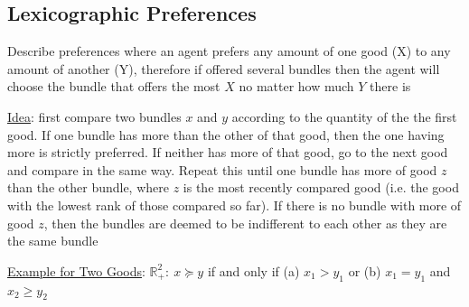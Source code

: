 \documentclass{article}
\begin{document}
\subsection{Lexicographic Preferences}
Describe preferences where an agent prefers any amount of one good (X) to any amount of another (Y), therefore if offered several bundles then the agent will choose the bundle that offers the most $X$ no matter how much $Y$ there is \par \vspace{0.3em}
  \underline{Idea}: first compare two bundles $x$ and $y$ according to the quantity of the the first good. If one bundle has more than the other of that good, then the one having more is strictly preferred. If neither has more of that good, go to the next good and compare in the same way. Repeat this until one bundle has more of good $z$ than the other bundle, where $z$ is the most recently compared good (i.e. the good with the lowest rank of those compared so far). If there is no bundle with more of good $z$, then the bundles are deemed to be indifferent to each other as they are the same bundle \par
  \underline{Example for Two Goods}: $\mathbb{R}_{+}^{2}: \ x \succeq y$ if and only if (a) $x_{1} > y_{1}$ or (b) $x_{1} = y_{1}$ and $x_{2} \geq y_{2}$
\end{document}
